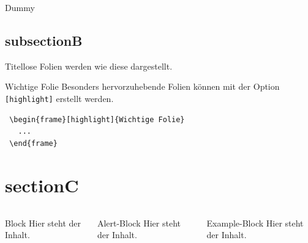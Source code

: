 \documentclass{beamer}
\begin{document}
\begin{frame}{Dummy}
  
\end{frame}

\subsection{subsectionB}

\begin{frame}
  Titellose Folien werden wie diese dargestellt.
\end{frame}

\begin{frame}{Wichtige Folie}
Besonders hervorzuhebende Folien können mit der Option
{\color{tuRed}\lstinline{[highlight]}} erstellt werden.
\begin{lstlisting}
 \begin{frame}[highlight]{Wichtige Folie}
   ...
 \end{frame}
\end{lstlisting}
\end{frame}


\section{sectionC}
\begin{frame}
  \begin{columns}[onlytextwidth]
    \begin{column}{0.3\textwidth}
      \begin{block}{Block}
        Hier steht der Inhalt.
      \end{block}
    \end{column}
    \begin{column}{0.3\textwidth}
      \begin{alertblock}{Alert-Block}
        Hier steht der Inhalt.
      \end{alertblock}
    \end{column}
    \begin{column}{0.3\textwidth}
      \begin{exampleblock}{Example-Block}
        Hier steht der Inhalt.
      \end{exampleblock}     
    \end{column}
  \end{columns}
\end{frame}
\end{document}
